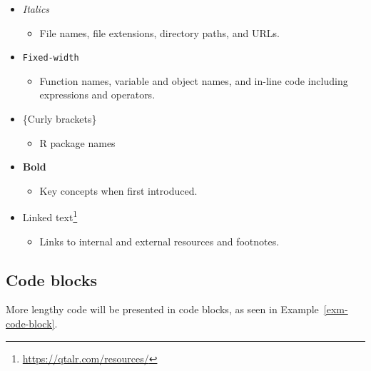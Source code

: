 \documentclass[
  letterpaper,
  krantz1]{latex/krantz-mod}
\providecommand{\tightlist}{%
  \setlength{\itemsep}{0pt}\setlength{\parskip}{0pt}}\usepackage{longtable,booktabs,array}
\theoremstyle{definition}
\theoremstyle{definition}
\theoremstyle{remark}
\DeclareRobustCommand{\href}[2]{#2\footnote{\url{#1}}}
\begin{document}
\begin{itemize}
\tightlist
\item
  \emph{Italics}

  \begin{itemize}
  \tightlist
  \item
    File names, file extensions, directory paths, and URLs.
  \end{itemize}
\item
  \texttt{Fixed-width}

  \begin{itemize}
  \tightlist
  \item
    Function names, variable and object names, and in-line code
    including expressions and operators.
  \end{itemize}
\item
  \{Curly brackets\}

  \begin{itemize}
  \tightlist
  \item
    R package names
  \end{itemize}
\item
  \textbf{Bold}

  \begin{itemize}
  \tightlist
  \item
    Key concepts when first introduced.
  \end{itemize}
\item
  \href{https://qtalr.com/resources/}{Linked text}

  \begin{itemize}
  \tightlist
  \item
    Links to internal and external resources and footnotes.
  \end{itemize}
\end{itemize}

\subsection*{Code blocks}\label{sec-preface-code-blocks}

More lengthy code will be presented in code blocks,
as seen in Example~\ref{exm-code-block}.
\end{document}
